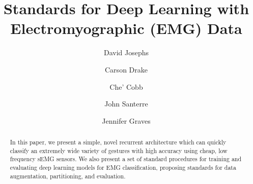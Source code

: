 \documentclass{llncs}
\title{Standards for Deep Learning with Electromyographic (EMG) Data}
\author{
David Josephs\inst{1} \and
Carson Drake\inst{1} \and
Che' Cobb\inst{1} \and
John Santerre\inst{1} \and
Jennifer Graves %
}
\institute{
Master of Science in Data Science, Southern Methodist University,
Dallas TX 75275 USA 
\email{\{josephsd, drakec, cobbc\}@smu.edu} %
}
\begin{document}
\maketitle              %

\setcounter{footnote}{0}
\begin{abstract} 
In this paper, we present a simple, novel recurrent architecture which can quickly classify an extremely wide variety of gestures with high accuracy using cheap, low frequency sEMG sensors. We also present a set of standard procedures for training and evaluating deep learning models for EMG classification, proposing standards for data augmentation, partitioning, and evaluation.
%
%
%
%




\end{abstract}
\end{document}
